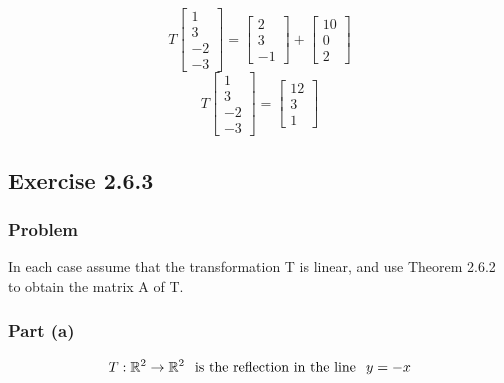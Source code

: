 \documentclass[12pt]{article}
\begin{document}
\[
  T\begin{bmatrix}
    1\\ 
    3\\ 
    -2\\ 
    -3 
  \end{bmatrix} = \begin{bmatrix}
  2\\ 
  3\\ 
  -1 
  \end{bmatrix} + \begin{bmatrix}
  10\\ 
  0\\ 
  2 
  \end{bmatrix}
\]
\[
  T\begin{bmatrix}
    1\\ 
    3\\ 
    -2\\ 
    -3 
  \end{bmatrix} = \begin{bmatrix}
  12\\ 
  3\\ 
  1 
  \end{bmatrix}
\]
\vspace{2in}
\subsection*{Exercise 2.6.3}
\subsubsection*{Problem}
In each case assume that the transformation T is linear, and use Theorem 2.6.2 to obtain the matrix A of T. 
\subsubsection*{Part (a)}
\[
  T: \mathbb{R}^2 \rightarrow \mathbb{R}^2 \hspace{0.1in} \text{is the reflection in the line} \hspace{0.1in} y = -x 
\]
\end{document}
